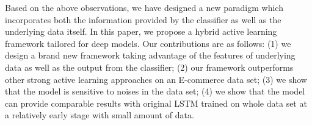     
Based on the above observations, we have designed a new paradigm which incorporates both the information provided by the classifier as well as the underlying data itself. In this paper, we propose a hybrid active learning framework tailored for deep models. Our contributions are as follows: 
(1) we design a brand new framework taking advantage of
the features of underlying data as well as the output from the classifier; 
(2) our framework outperforms other strong active learning approaches on 
an E-commerce data set; 
(3) we show that the model is  sensitive to noises in the data set; 
(4) we show that the model can provide comparable results with 
original LSTM trained on whole data set at a relatively early stage
with small amount of data.
